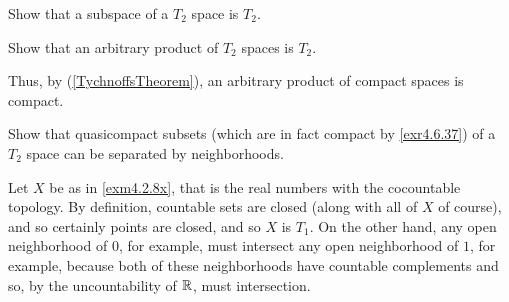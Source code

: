\begin{exr}\label{exr4.6.37}
Show that a subspace of a $T_2$ space is $T_2$.
\end{exr}
\begin{exr}\label{exr4.6.38}
Show that an arbitrary product of $T_2$ spaces is $T_2$.
\begin{rmk}
Thus, by  (\cref{TychnoffsTheorem}), an arbitrary product of compact spaces is compact.
\end{rmk}
\end{exr}
\begin{exr}\label{exr4.6.39}
Show that quasicompact subsets (which are in fact compact by \cref{exr4.6.37}) of a $T_2$ space can be separated by neighborhoods.
\end{exr}
\begin{exm}
Let $X$ be as in \cref{exm4.2.8x}, that is the real numbers with the cocountable topology.  By definition, countable sets are closed (along with all of $X$ of course), and so certainly points are closed, and so $X$ is $T_1$.  On the other hand, any open neighborhood of $0$, for example, must intersect any open neighborhood of $1$, for example, because both of these neighborhoods have countable complements and so, by the uncountability of $\mathbb{R}$, must intersection.
\end{exm}

